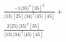 \documentclass[varwidth, border=5pt]{standalone}
\begin{document}
\begin{my}
$\begin{gathered}
\scriptscriptstyle\frac{-1⟨35⟩^3[35]^2}{⟨13⟩[25]⟨34⟩^2⟨45⟩[45]}+\\
\scriptscriptstyle\frac{2⟨25⟩⟨35⟩^2[35]}{⟨13⟩⟨34⟩^2⟨45⟩[45]}\phantom{+}
\end{gathered}$
\end{my}
\end{document}
